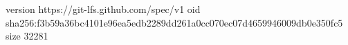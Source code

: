 version https://git-lfs.github.com/spec/v1
oid sha256:f3b59a36bc4101e96ea5edb2289dd261a0cc070ec07d4659946009db0e350fc5
size 32281
